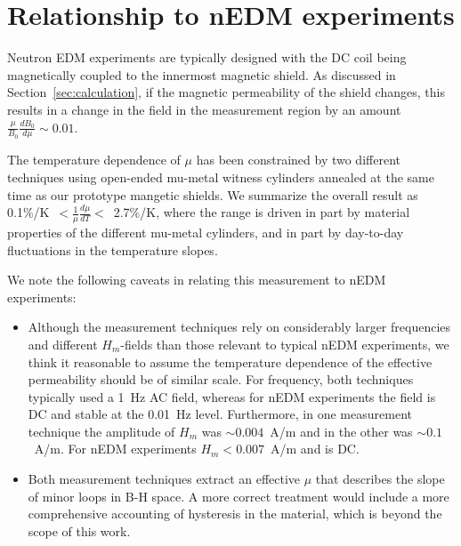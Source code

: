 \documentclass[review]{elsarticle}
\begin{document}






\section{Relationship to nEDM experiments}

Neutron EDM experiments are typically designed with the DC coil being
magnetically coupled to the innermost magnetic shield.  As discussed
in Section~\ref{sec:calculation}, if the magnetic permeability of the
shield changes, this results in a change in the field in the
measurement region by an amount $\frac{\mu}{B_0}\frac{dB_0}{d\mu}\sim
0.01$.

The temperature dependence of $\mu$ has been constrained by two
different techniques using open-ended mu-metal witness cylinders
annealed at the same time as our prototype mangetic shields.  We
summarize the overall result as
0.1\%/K~$<\frac{1}{\mu}\frac{d\mu}{dT}<$~2.7\%/K, where the range is
driven in part by material properties of the different mu-metal
cylinders, and in part by day-to-day fluctuations in the temperature
slopes.



We note the following caveats in relating this measurement to nEDM
experiments:
\begin{itemize}
\item Although the measurement techniques rely on considerably larger
  frequencies and different $H_m$-fields than those relevant to
  typical nEDM experiments, we think it reasonable to assume the
  temperature dependence of the effective permeability should be of
  similar scale.  For frequency, both techniques typically used a 1~Hz
  AC field, whereas for nEDM experiments the field is DC and stable at
  the 0.01~Hz level.  Furthermore, in one measurement technique the
  amplitude of $H_m$ was $\sim 0.004$~A/m and in the other was $\sim
  0.1$~A/m.  For nEDM experiments $H_m<0.007$~A/m and is DC.
\item Both measurement techniques extract an effective $\mu$ that
  describes the slope of minor loops in B-H space.  A more correct
  treatment would include a more comprehensive accounting of
  hysteresis in the material, which is beyond the scope of this work.
\end{itemize}
\end{document}
